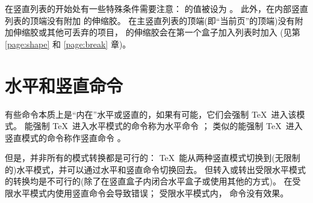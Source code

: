 \documentclass{book}
\begin{document}
在竖直列表的开始处有一些特殊条件需要注意：
 的值被设为 \n{-1000pt}。
此外，在内部竖直列表的顶端没有附加  的伸缩胶。
在主竖直列表的顶端(即“当前页”的顶端)没有附加伸缩胶或其他可丢弃的项目，
 的伸缩胶会在第一个盒子加入列表时加入
(见第 \ref{page:shape} 和 \ref{page:break} 章)。

\section{水平和竖直命令}

有些命令本质上是“内在”水平或竖直的，如果有可能，它们会强制 \TeX\ 进入该模式。
能强制 \TeX\ 进入水平模式的命令称为水平命令 ；
类似的能强制 \TeX\ 进入竖直模式的命令称作竖直命令 。

但是，并非所有的模式转换都是可行的：
\TeX\ 能从两种竖直模式切换到(无限制的)水平模式，并可以通过水平和竖直命令切换回去。
但转入或转出受限水平模式的转换均是不可行的(除了在竖直盒子内闭合水平盒子或使用其他的方式)。
在受限水平模式内使用竖直命令会导致错误；
受限水平模式内， 命令没有效果。
\end{document}
